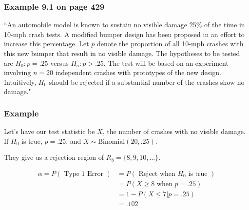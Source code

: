 \documentclass{beamer}
\begin{document}
\begin{frame}
\frametitle{Example 9.1 on page 429}

``An automobile model is known to sustain no visible damage 25\% of the time in 10-mph crash tests. A modified bumper design has been proposed in an effort to increase this percentage. Let $p$ denote the proportion of all 10-mph crashes with this new bumper that result in no visible damage. The hypotheses to be tested are $H_0: p = .25$ versus $H_a: p > .25$. The test will be based on an experiment involving $n=20$ independent crashes with prototypes of the new design. Intuitively, $H_0$ should be rejected if a substantial number of the crashes show no damage."

\end{frame}

\begin{frame}
\frametitle{Example}

Let's have our test statistic be $X$, the number of crashes with no visible damage. If $H_0$ is true, $p=.25$, and $X \sim \text{Binomial}(20,.25)$.
\newline

They give us a rejection region of $R_8 = \{8,9,10,\ldots\}$.
\newline

\begin{align*}
\alpha = P(\text{ Type 1 Error }) &= P(\text{ Reject when $H_0$ is true }) \\
&= P( X \ge 8 \text{ when } p = .25) \\
&= 1 - P(X \le 7 | p = .25) \\
&= .102
\end{align*}
\end{frame}
\end{document}

